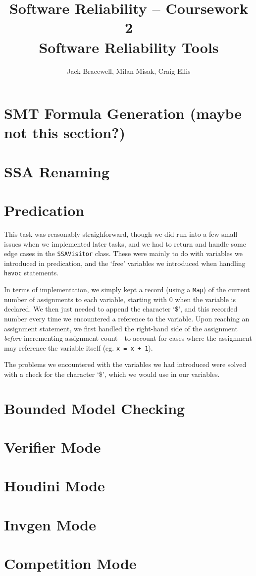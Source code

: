 \documentclass[11pt]{article}
\title{Software Reliability -- Coursework 2 \\ Software Reliability Tools}
\author{Jack Bracewell, Milan Misak, Craig Ellis}
\date{}
\begin{document}
\maketitle

\section{SMT Formula Generation (maybe not this section?)}
\section{SSA Renaming}
\section{Predication}

This task was reasonably straighforward, though we did run into a few small issues when we implemented later tasks, and we had to return and handle some edge cases in the \verb|SSAVisitor| class. These were mainly to do with variables we introduced in predication, and the `free' variables we introduced when handling \verb|havoc| statements.

In terms of implementation, we simply kept a record (using a \verb|Map|) of the current number of assignments to each variable, starting with 0 when the variable is declared. We then just needed to append the character `\$', and this recorded number every time we encountered a reference to the variable. Upon reaching an assignment statement, we first handled the right-hand side of the assignment \emph{before} incrementing assignment count - to account for cases where the assignment may reference the variable itself (eg. \verb|x = x + 1|).

The problems we encountered with the variables we had introduced were solved with a check for the character `\$', which we would use in our variables.

\section{Bounded Model Checking}
\section{Verifier Mode}
\section{Houdini Mode}
\section{Invgen Mode}
\section{Competition Mode}
\end{document}
